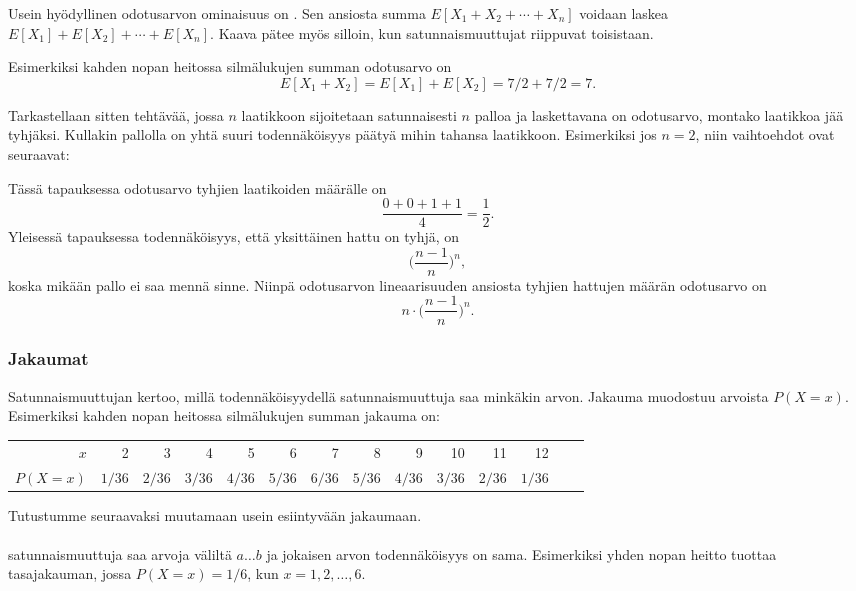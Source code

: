 Usein hyödyllinen odotusarvon ominaisuus on .
Sen ansiosta summa $E[X_1+X_2+\cdots+X_n]$ voidaan laskea $E[X_1]+E[X_2]+\cdots+E[X_n]$.
Kaava pätee myös silloin, kun satunnaismuuttujat riippuvat toisistaan.

Esimerkiksi kahden nopan heitossa silmälukujen summan odotusarvo on
\[E[X_1+X_2]=E[X_1]+E[X_2]=7/2+7/2=7.\]

Tarkastellaan sitten tehtävää,
jossa $n$ laatikkoon sijoitetaan
satunnaisesti $n$ palloa
ja laskettavana on odotusarvo,
montako laatikkoa jää tyhjäksi.
Kullakin pallolla on yhtä suuri todennäköisyys
päätyä mihin tahansa laatikkoon.
Esimerkiksi jos $n=2$, niin
vaihtoehdot ovat seuraavat:
\begin{center}
\end{center}
Tässä tapauksessa odotusarvo
tyhjien laatikoiden määrälle on
\[\frac{0+0+1+1}{4} = \frac{1}{2}.\]
Yleisessä tapauksessa
todennäköisyys, että yksittäinen hattu on tyhjä,
on
\[\Big(\frac{n-1}{n}\Big)^n,\]
koska mikään pallo ei saa mennä sinne.
Niinpä odotusarvon lineaarisuuden ansiosta tyhjien hattujen
määrän odotusarvo on
\[n \cdot \Big(\frac{n-1}{n}\Big)^n.\]

\subsubsection{Jakaumat}


Satunnaismuuttujan  kertoo,
millä todennäköisyydellä satunnaismuuttuja
saa minkäkin arvon.
Jakauma muodostuu arvoista $P(X=x)$.
Esimerkiksi kahden nopan heitossa
silmälukujen summan jakauma on:
\begin{center}
\small {
\begin{tabular}{r|rrrrrrrrrrrrr}
$x$ & 2 & 3 & 4 & 5 & 6 & 7 & 8 & 9 & 10 & 11 & 12 \\
$P(X=x)$ & $1/36$ & $2/36$ & $3/36$ & $4/36$ & $5/36$ & $6/36$ & $5/36$ & $4/36$ & $3/36$ & $2/36$ & $1/36$ \\
\end{tabular}
}
\end{center}
Tutustumme seuraavaksi muutamaan usein esiintyvään jakaumaan.
~\\\\
 satunnaismuuttuja
saa arvoja väliltä $a \ldots b$
ja jokaisen arvon todennäköisyys on sama.
Esimerkiksi yhden nopan heitto tuottaa tasajakauman,
jossa $P(X=x)=1/6$, kun $x=1,2,\ldots,6$.

